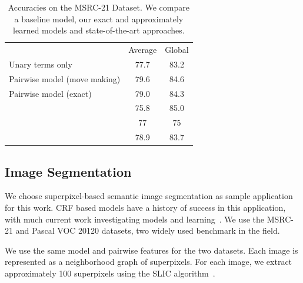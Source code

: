 \begin{table}
    \begin{center}
    \begin{tabularx}{\linewidth}{@{\extracolsep{\fill}}lcc}
        \toprule
                    & Average & Global \\
        \cmidrule{1-3}
    Unary terms only & 77.7& 83.2 \\
    Pairwise model (move making)& 79.6&84.6\\
    Pairwise model (exact)& 79.0 & 84.3\\
        \cmidrule{1-3}
    \citet{ladicky2009associative} & 75.8& 85.0\\
    \citet{gonfaus2010harmony} & 77&  75\\
    \citet{lucchi2013learning} & 78.9& 83.7\\
    \bottomrule
    \end{tabularx}
    \end{center}
    \caption{Accuracies on the MSRC-21 Dataset.  We compare a baseline model,
    our exact and approximately learned models and state-of-the-art
    approaches.\label{msrcacc}}
    
\end{table}




\subsection{Image Segmentation}
We choose superpixel-based semantic image segmentation as sample application
for this work.  CRF based models have a history of success in this application,
with much current work investigating models and
learning~\citep{gonfaus2010harmony, lucchi2013learning, ladicky2009associative,
kohli2009robust, krahenbuhl2012efficient}.  We use the MSRC-21 and Pascal VOC 20120 datasets, two
widely used benchmark in the field.

We use the same model and pairwise features for the two datasets.
Each image is represented as a neighborhood graph of superpixels.
For each image, we extract approximately 100 superpixels using 
the SLIC algorithm~\citep{achanta2012slic}.

